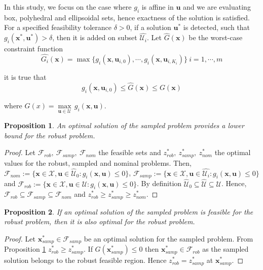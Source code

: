 \documentclass[sn-mathphys-num]{sn-jnl}
\newtheorem{proposition}{Proposition}
\begin{document}
In this study, we focus on the case where $g_i$ is affine in $\bm u$ and we are evaluating box, polyhedral and ellipsoidal sets, hence exactness of the solution is satisfied. For a specified feasibility tolerance $\delta>0$, if a solution $\bm u^*$ is detected, such that $g_i(\bm x^*,\bm u^*)>\delta$, then it is added on subset $\hat{\mathcal{U}_i}$.
Let $\hat{G}(\bm x)$ be the worst-case constraint function 
\begin{equation*}
    \hat{G_i}(\bm x)=\max \{g_i(\bm x,\bm u_{i,0}),\cdots,g_i(\bm x,\bm u_{i,K_i})\}~ i=1,\cdots,m
\end{equation*}

it is true that 
\begin{equation*}
    g_i(\bm x, \bm u_{i,0})\leq\hat{G}(\bm x)\leq G(\bm x)
\end{equation*}

where $G(x)=\underset{\bm u\in \mathcal{U}}{\max }\, g_i(\bm x,\bm u)$. 
\begin{proposition}\label{pr:bound}
An optimal solution of the sampled problem provides a lower bound for the robust problem.
\end{proposition}

\begin{proof}
    Let $\mathcal{F}_{rob},~\mathcal{F}_{samp},~\mathcal{F}_{nom}$ the feasible sets and $z^*_{rob},~z^*_{samp},~z^*_{nom}$ the optimal values for the robust, sampled and nominal problems. Then,
    $\mathcal{F}_{nom}:=\{\bm x\in \mathcal{X}, \bm u \in \hat{\mathcal{U}}_0: g_i(\bm x,\bm u)\leq0\}$, $\mathcal{F}_{samp}:=\{\bm x\in \mathcal{X}, \bm u \in \hat{\mathcal{U}_i}: g_i(\bm x,\bm u)\leq0\}$ and $\mathcal{F}_{rob}:=\{\bm x\in \mathcal{X}, \bm u \in\mathcal{U}: g_i(\bm x,\bm u)\leq0\}$. By definition $\hat{\mathcal{U}}_0\subseteq\hat{\mathcal{U}}\subseteq\mathcal{U}$. Hence, $\mathcal{F}_{rob}\subseteq \mathcal{F}_{samp} \subseteq \mathcal{F}_{nom}$ and $z^*_{rob}\geq z^*_{samp}\geq z^*_{nom}$.
\end{proof}

\begin{proposition}\label{pro:opt}
    If an optimal solution of the sampled problem is feasible for the robust problem, then it is also optimal for the robust problem.
\end{proposition}

\begin{proof}
Let $\bm x^*_{samp}\in \mathcal{F}_{samp}$ be an optimal solution for the sampled problem. From Proposition \ref{pr:bound} $z^*_{rob}\geq z^*_{samp}$. If $G(\bm x^*_{samp})\leq0$ then $\bm x^*_{samp}\in \mathcal{F}_{rob}$ as the sampled solution belongs to the robust feasible region. Hence  $z^*_{rob}= z^*_{samp}$ at $\bm x^*_{samp}$.     
\end{proof}
\end{document}
